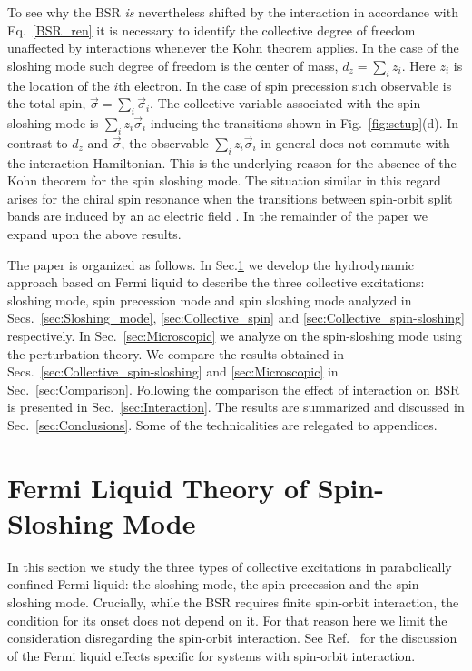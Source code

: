 To see why the BSR {\it is} nevertheless shifted by the interaction in accordance with Eq.~\eqref{BSR_ren} it is necessary to identify the collective degree of freedom unaffected by interactions whenever the Kohn theorem applies. 
In the case of the sloshing mode such degree of freedom is the center of mass, $d_z =\sum_i z_i$.
Here $z_i$ is the location of the $i$th electron.
In the case of spin precession such observable is the total spin, $\vec{\sigma} = \sum_{i} \vec{\sigma}_i$. 
The collective variable associated with the spin sloshing mode is $\sum_{i} z_i \vec{\sigma}_i$ inducing the transitions shown in Fig.~\ref{fig:setup}(d).
In contrast to $d_z$ and $\vec{\sigma}$, the observable $\sum_{i} z_i \vec{\sigma}_i$ in general does not commute with the interaction Hamiltonian.
This is the underlying reason for the absence of the Kohn theorem for the spin sloshing mode.
The situation similar in this regard arises for the chiral spin resonance when the transitions between spin-orbit split bands are induced by an ac electric field \cite{Shekhter2005}.
In the remainder of the paper we expand upon the above results.


The paper is organized as follows.
In Sec.\ref{sec:Fermi} we develop the hydrodynamic approach based on Fermi liquid to describe the three collective excitations: sloshing mode, spin precession mode and spin sloshing mode analyzed in Secs.~\ref{sec:Sloshing_mode}, \ref{sec:Collective_spin} and \ref{sec:Collective_spin-sloshing} respectively.
In Sec.~\ref{sec:Microscopic} we analyze on the spin-sloshing mode using the perturbation theory.
We compare the results obtained in Secs.~\ref{sec:Collective_spin-sloshing} and \ref{sec:Microscopic} in Sec.~\ref{sec:Comparison}.
Following the comparison the effect of interaction on BSR is presented in Sec.~\ref{sec:Interaction}.
The results are summarized and discussed in Sec.~\ref{sec:Conclusions}. 
Some of the technicalities are relegated to appendices.

\section{Fermi Liquid Theory of Spin-Sloshing Mode}
\label{sec:Fermi}

In this section we study the three types of collective excitations in parabolically confined Fermi liquid: the sloshing mode, the spin precession and the spin sloshing mode.
Crucially, while the BSR requires finite spin-orbit interaction, the condition for its onset does not depend on it.
For that reason here we limit the consideration disregarding the spin-orbit interaction.
See Ref.~\cite{Chen1999,Ashrafi2012,Ashrafi2013} for the discussion of the Fermi liquid effects specific for systems with spin-orbit interaction.

